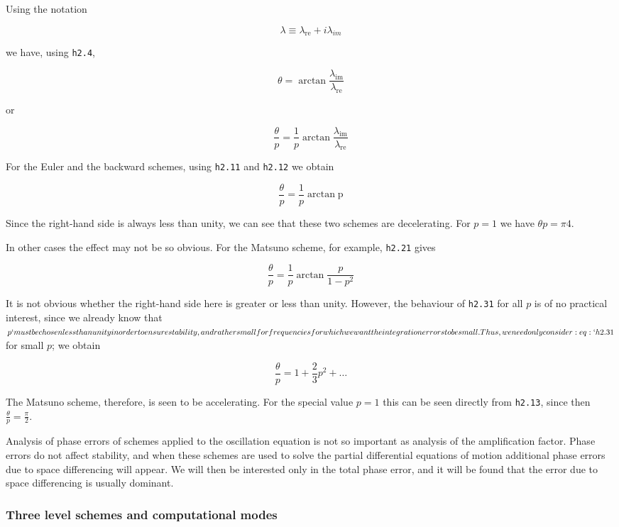Using the notation

{\[\lambda \equiv \lambda_{\text{re}} + i\lambda_{im}\]}

we have, using \texttt{h2.4},

{\[\theta = \arctan\frac{\lambda_{\text{im}}}{\lambda_{\text{re}}}\]}

or

{\[\frac{\theta}{p} = \frac{1}{p}\arctan\frac{\lambda_{\text{im}}}{\lambda_{\text{re}}}\]}

For the Euler and the backward schemes, using \texttt{h2.11} and
\texttt{h2.12} we obtain

{\[\frac{\theta}{p} = \frac{1}{p}\arctan\text{p}\]}

Since the right-hand side is always less than unity, we can see that
these two schemes are decelerating. For \(p = 1\) we have
\(\theta p = \pi 4\).

In other cases the effect may not be so obvious. For the Matsuno scheme,
for example, \texttt{h2.21} gives

{\[\frac{\theta}{p} = \frac{1}{p}\arctan\frac{p}{1 - p^{2}}\]}

It is not obvious whether the right-hand side here is greater or less
than unity. However, the behaviour of \texttt{h2.31} for all \(p\) is of
no practical interest, since we already know that \(p`must be chosen
less than unity in order to ensure stability, and rather small for
frequencies for which we want the integration errors to be small. Thus,
we need only consider :eq:`h2.31\) for small \(p\); we obtain

\[\frac{\theta}{p} = 1 + \frac{2}{3}p^{2} + \ldots\]

The Matsuno scheme, therefore, is seen to be accelerating. For the
special value \(p = 1\) this can be seen directly from \texttt{h2.13},
since then \(\frac{\theta}{p} = \frac{\pi}{2}\).

Analysis of phase errors of schemes applied to the oscillation equation
is not so important as analysis of the amplification factor. Phase
errors do not affect stability, and when these schemes are used to solve
the partial differential equations of motion additional phase errors due
to space differencing will appear. We will then be interested only in
the total phase error, and it will be found that the error due to space
differencing is usually dominant.

\subsubsection{Three level schemes and computational
modes}\label{three-level-schemes-and-computational-modes}

